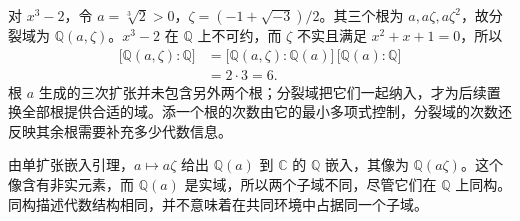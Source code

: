 \ProseParagraphBreak
对 \(x^3-2\)，令 \(a=\sqrt[3]2>0\)，\(\zeta=(-1+\sqrt{-3})/2\)。其三个根为 \(a,a\zeta,a\zeta^2\)，故分裂域为 \(\mathbb Q(a,\zeta)\)。\(x^3-2\) 在 \(\mathbb Q\) 上不可约，而 \(\zeta\) 不实且满足 \(x^2+x+1=0\)，所以
\begin{equation}\label{b1:eq:cubic-splitting-degree}
	\begin{aligned}
		\bigl[\mathbb Q(a,\zeta):\mathbb Q\bigr] &=\bigl[\mathbb Q(a,\zeta):\mathbb Q(a)\bigr]\,\bigl[\mathbb Q(a):\mathbb Q\bigr]\\
		&=2\cdot3=6.
	\end{aligned}
\end{equation}
根 \(a\) 生成的三次扩张并未包含另外两个根；分裂域把它们一起纳入，才为后续置换全部根提供合适的域。添一个根的次数由它的最小多项式控制，分裂域的次数还反映其余根需要补充多少代数信息。

\ProseParagraphBreak
由单扩张嵌入引理，\(a\mapsto a\zeta\) 给出 \(\mathbb Q(a)\) 到 \(\mathbb C\) 的 \(\mathbb Q\) 嵌入，其像为 \(\mathbb Q(a\zeta)\)。这个像含有非实元素，而 \(\mathbb Q(a)\) 是实域，所以两个子域不同，尽管它们在 \(\mathbb Q\) 上同构。同构描述代数结构相同，并不意味着在共同环境中占据同一个子域。
